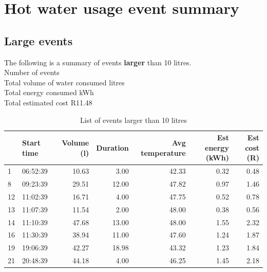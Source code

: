 \documentclass{article}\usepackage[]{graphicx}\usepackage[]{color}
\newenvironment{knitrout}{}{} %
\begin{document}
\newpage
\section{Hot water usage event summary}



\subsection{Large events}

The following is a summary of events \textbf{larger} than 10 litres. \\

Number of events \\
Total volume of water consumed  litres\\
Total energy consumed  kWh\\
Total estimated cost \dotfill R11.48\\

\begin{center}
\begin{table}[h!]
\begin{knitrout}
\color{fgcolor}
\begin{tabular}{l|l|r|r|r|r|r}
\hline
  & Start time & Volume (l) & Duration & Avg temperature & Est energy (kWh) & Est cost (R)\\
\hline
1 & 06:52:39 & 10.63 & 3.00 & 42.33 & 0.32 & 0.48\\
\hline
8 & 09:23:39 & 29.51 & 12.00 & 47.82 & 0.97 & 1.46\\
\hline
12 & 11:02:39 & 16.71 & 4.00 & 47.75 & 0.52 & 0.78\\
\hline
13 & 11:07:39 & 11.54 & 2.00 & 48.00 & 0.38 & 0.56\\
\hline
14 & 11:10:39 & 47.68 & 13.00 & 48.00 & 1.55 & 2.32\\
\hline
16 & 11:30:39 & 38.94 & 11.00 & 47.60 & 1.24 & 1.87\\
\hline
19 & 19:06:39 & 42.27 & 18.98 & 43.32 & 1.23 & 1.84\\
\hline
21 & 20:48:39 & 44.18 & 4.00 & 46.25 & 1.45 & 2.18\\
\hline
\end{tabular}


\end{knitrout}
\caption{List of events larger than 10 litres}
\end{table}
\end{center}
\end{document}
